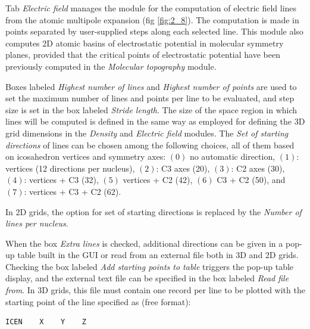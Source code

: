 \documentclass[10pt]{article}
\begin{document}
Tab {\it Electric field} manages the module for the computation of
electric field lines from the atomic multipole expansion (fig \ref{fig:2_8}).
The computation is made in points separated by user-supplied steps along each
selected line. 
This module also computes 2D atomic basins of electrostatic potential in molecular 
symmetry planes, provided that the critical points of electrostatic potential have been previously computed in the {\it Molecular 
topography} module.


Boxes labeled {\it Highest
number of lines} and {\it Highest number of points} are used to set
the maximum number of lines and points per line to be evaluated, and step size is
set in the box labeled {\it Stride length}. The size of the space region in which
lines will be computed is defined in the same way as employed for defining the
3D grid dimensions in the {\it Density}  and {\it Electric field} modules.
The {\it Set of starting directions} of lines can be chosen among the following choices, 
all of them based on icosahedron vertices and symmetry axes:
$(0)$ no automatic direction,
$(1)$: vertices (12 directions per nucleus), $(2)$: C3 axes (20), $(3)$: C2 axes (30),
$(4)$: vertices + C3 (32), $(5)$ vertices + C2 (42), $(6)$ C3 + C2 (50), and
$(7)$: vertices + C3 + C2 (62).

In 2D grids, the option for set of starting directions is replaced by the {\it Number of lines per nucleus}.


When the box {\it Extra lines} is checked, additional directions can be given in a pop-up table built in the GUI or read from an 
external file both in 3D and 2D grids. Checking the box labeled {\it Add starting points to table} triggers the pop-up table 
display, and the external text file can be specified in the box labeled {\it Read file
from}. In 3D grids, this file must contain one record per line to be plotted
with the starting point of the line specified as (free format):

\begin{verbatim}
ICEN    X    Y    Z   
\end{verbatim}
\end{document}

